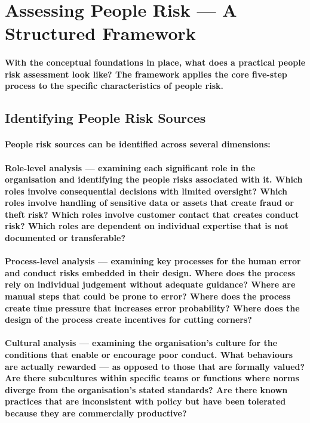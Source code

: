 \section{Assessing People Risk — A Structured Framework}
\paragraph{With the conceptual foundations in place, what does a practical people risk assessment look like? The framework applies the core five-step process to the specific characteristics of people risk.}

\subsection{Identifying People Risk Sources}
\paragraph{People risk sources can be identified across several dimensions:}
\paragraph{\textbf{Role-level analysis} — examining each significant role in the organisation and identifying the people risks associated with it. Which roles involve consequential decisions with limited oversight? Which roles involve handling of sensitive data or assets that create fraud or theft risk? Which roles involve customer contact that creates conduct risk? Which roles are dependent on individual expertise that is not documented or transferable?}
\paragraph{\textbf{Process-level analysis} — examining key processes for the human error and conduct risks embedded in their design. Where does the process rely on individual judgement without adequate guidance? Where are manual steps that could be prone to error? Where does the process create time pressure that increases error probability? Where does the design of the process create incentives for cutting corners?}
\paragraph{\textbf{Cultural analysis} — examining the organisation's culture for the conditions that enable or encourage poor conduct. What behaviours are actually rewarded — as opposed to those that are formally valued? Are there subcultures within specific teams or functions where norms diverge from the organisation's stated standards? Are there known practices that are inconsistent with policy but have been tolerated because they are commercially productive?}
